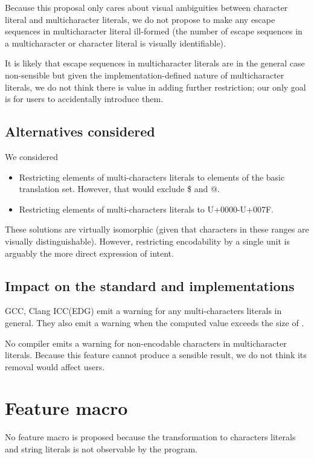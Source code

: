\documentclass{wg21}
\begin{document}
Because this proposal only cares about visual ambiguities between character literal and multicharacter literals, we do not propose to
make any escape sequences in multicharacter literal ill-formed (the number of escape sequences in a multicharacter or character literal is visually identifiable).

It is likely that escape sequences in multicharacter literals are in the general case non-sensible but given the implementation-defined nature of
multicharacter literals, we do not think there is value in adding further restriction; our only goal is for users to accidentally introduce them.

\subsection{Alternatives considered}

We considered
\begin{itemize}
\item Restricting elements of multi-characters literals to elements of the basic translation set. However, that would exclude \$ and @.
\item Restricting elements of multi-characters literals to U+0000-U+007F.
\end{itemize}

These solutions are virtually isomorphic (given that characters in these ranges are visually distinguishable). However, restricting encodability by a single unit is arguably the more direct expression of intent.


\subsection{Impact on the standard and implementations}

GCC, Clang ICC(EDG) emit a warning for any multi-characters literals in general. They also emit a warning when the computed value exceeds the size of .

No compiler emits a warning for non-encodable characters in multicharacter literals.
Because this feature cannot produce a sensible result, we do not think its removal would affect users.

\section{Feature macro}

No feature macro is proposed because the transformation to characters literals and string literals is not observable by the program.
\end{document}

